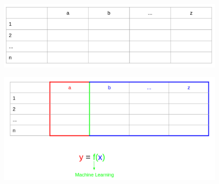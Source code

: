 \documentclass{beamer}
\begin{document}

\begin{frame}
 \begin{figure}[ht!]
 \centering
 \includegraphics[scale=0.3]{table1.png}
\end{figure}

\end{frame}

\begin{frame}
 \begin{figure}[ht!]
 \centering
 \includegraphics[scale=0.3]{table2.png}
\end{figure}
\end{frame}
\end{document}
